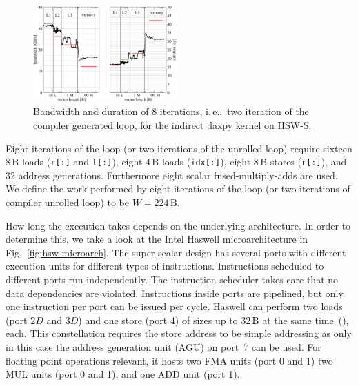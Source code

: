 \begin{figure}[tp]
  \centering
  \includegraphics[width=0.49\textwidth,clip=true]{images/daxpy-indirect-bw-hasep1-f-2_3-w-cy}
   \caption{Bandwidth and duration of 8 iterations, i.\,e.,\ two iteration of the
compiler generated loop, for the indirect daxpy kernel on HSW-S.}
  \label{fig:daxpy-indirect:perf}
\end{figure}

Eight iterations of the loop (or two iterations of the unrolled loop) require
sixteen $8$\,B loads (\verb|r[:]| and
\verb|l[:]|), eight $4$\,B loads (\verb'idx[:]'), eight
$8$\,B stores (\verb'r[:]'), and $32$ address generations.
Furthermore eight scalar fused-multiply-adds are used. 
We define the work performed by eight iterations of the loop (or two iterations of compiler unrolled loop) to be $W =
224$\,B.

How long the execution takes depends on the underlying architecture. 
In order to determine this, we take a look at the Intel Haswell
microarchitecture in Fig.~\ref{fig:hsw-microarch}.
The super-scalar design has several ports with different execution units for
different types of instructions.
Instructions scheduled to different ports run independently.
The instruction scheduler takes care that no data dependencies are violated.
Instructions inside ports are pipelined, but only one instruction per port can
be issued per cycle.
Haswell can perform two loads (port $2D$ and $3D$) and one store (port $4$) of
sizes up to $32$\,B at the same time~(\cite{agner-2016-11-3}), each.
This constellation requires the store address to be simple addressing as only in
this case the address generation unit (AGU) on port~$7$ can be used.
%
For floating point operations relevant, it hosts two FMA units (port 0 and
1) two MUL units (port 0 and 1), and one ADD unit (port 1).

